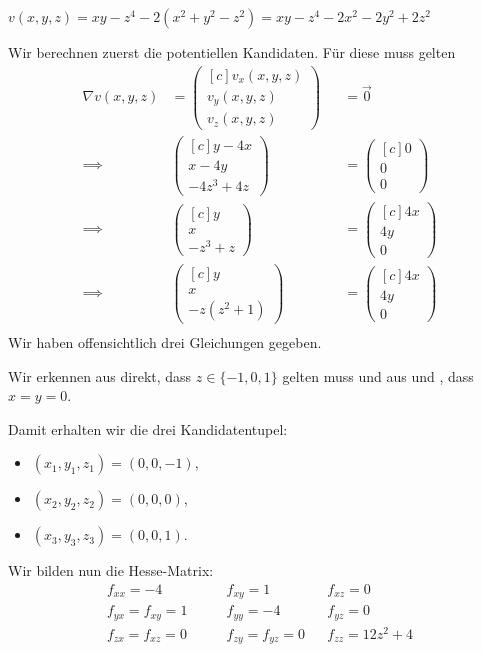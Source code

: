 \documentclass[answers]{exam}
\newcommand{\Rnum}[1]{\uppercase\expandafter{\romannumeral #1\relax}}
\newcommand{\vektor}[1]{\begin{pmatrix*}[c] #1 \end{pmatrix*}}
\begin{document}
\begin{questions}
\begin{parts}
\begin{solution}
            $v(x, y, z) = xy - z^4 -2(x^2 + y^2 -z^2) = xy - z^4 -2x^2 -2y^2 + 2z^2$

            Wir berechnen zuerst die potentiellen Kandidaten.
            Für diese muss gelten
            $$
                \begin{aligned}
                    \nabla v(x, y, z) & = \vektor{v_x(x, y, z)      \\ v_y(x, y, z)\\ v_z(x, y, z)} && = \vec{0} \\
                    \implies \quad    & \vektor{              y -4x \\ x -4y \\ -4z^3 +4z}              &  & = \vektor{0 \\ 0 \\ 0} \\
                    \implies \quad    & \vektor{              y     \\ x \\ -z^3 +z}              &  & = \vektor{4x \\ 4y \\ 0} \\
                    \implies \quad    & \vektor{              y     \\ x \\ -z(z^2 +1)}              &  & = \vektor{4x \\ 4y \\ 0} \\
                \end{aligned}
            $$
            Wir haben offensichtlich drei Gleichungen gegeben.

            Wir erkennen aus \Rnum{3} direkt, dass $z \in \{-1, 0, 1\}$ gelten muss und aus \Rnum{2} und \Rnum{1}, dass $x = y = 0$.

            Damit erhalten wir die drei Kandidatentupel:
            \begin{itemize}
                \item $(x_1, y_1, z_1) = (0, 0, -1)$,
                \item $(x_2, y_2, z_2) = (0, 0, 0)$,
                \item $(x_3, y_3, z_3) = (0, 0, 1)$.
            \end{itemize}

            Wir bilden nun die Hesse-Matrix:
            $$
                \begin{aligned}
                    f_{xx} = -4 \qquad         & f_{xy} = 1          &  & f_{xz} = 0         \\
                    f_{yx} = f_{xy} = 1 \qquad & f_{yy} = -4         &  & f_{yz} = 0         \\
                    f_{zx} = f_{xz} = 0 \qquad & f_{zy} = f_{yz} = 0 &  & f_{zz} = 12z^2 + 4
                \end{aligned}
            $$


\end{solution}
\end{parts}
\end{questions}
\end{document}
